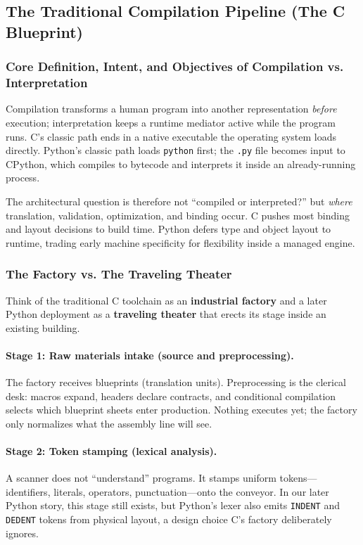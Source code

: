 \documentclass[a4paper,twoside]{report}
\begin{document}
\subsection{The Traditional Compilation Pipeline (The C Blueprint)}

\subsubsection{Core Definition, Intent, and Objectives of Compilation vs. Interpretation}

Compilation transforms a human program into another representation \emph{before} execution; interpretation keeps a runtime mediator active while the program runs. C's classic path ends in a native executable the operating system loads directly. Python's classic path loads \texttt{python} first; the \texttt{.py} file becomes input to CPython, which compiles to bytecode and interprets it inside an already-running process.

The architectural question is therefore not ``compiled or interpreted?'' but \emph{where} translation, validation, optimization, and binding occur. C pushes most binding and layout decisions to build time. Python defers type and object layout to runtime, trading early machine specificity for flexibility inside a managed engine.

\subsubsection{The Factory vs. The Traveling Theater}

Think of the traditional C toolchain as an \textbf{industrial factory} and a later Python deployment as a \textbf{traveling theater} that erects its stage inside an existing building.

\paragraph{Stage 1: Raw materials intake (source and preprocessing).}
The factory receives blueprints (translation units). Preprocessing is the clerical desk: macros expand, headers declare contracts, and conditional compilation selects which blueprint sheets enter production. Nothing executes yet; the factory only normalizes what the assembly line will see.

\paragraph{Stage 2: Token stamping (lexical analysis).}
A scanner does not ``understand'' programs. It stamps uniform tokens---identifiers, literals, operators, punctuation---onto the conveyor. In our later Python story, this stage still exists, but Python's lexer also emits \texttt{INDENT} and \texttt{DEDENT} tokens from physical layout, a design choice C's factory deliberately ignores.
\end{document}
